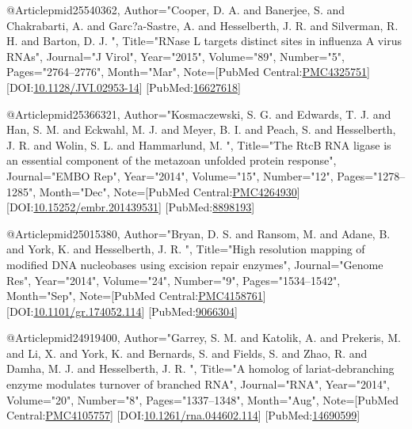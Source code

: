 @Article{pmid25540362,
   Author="Cooper, D. A.  and Banerjee, S.  and Chakrabarti, A.  and Garc?a-Sastre, A.  and Hesselberth, J. R.  and Silverman, R. H.  and Barton, D. J. ",
   Title="{{R}{N}ase {L} targets distinct sites in influenza {A} virus {R}{N}{A}s}",
   Journal="J Virol",
   Year="2015",
   Volume="89",
   Number="5",
   Pages="2764--2776",
   Month="Mar",
   Note={[PubMed Central:\href{https://www.ncbi.nlm.nih.gov/pmc/articles/PMC4325751}{PMC4325751}] [DOI:\href{https://dx.doi.org/10.1128/JVI.02953-14}{10.1128/JVI.02953-14}] [PubMed:\href{https://www.ncbi.nlm.nih.gov/pubmed/16627618}{16627618}] }
}

@Article{pmid25366321,
   Author="Kosmaczewski, S. G.  and Edwards, T. J.  and Han, S. M.  and Eckwahl, M. J.  and Meyer, B. I.  and Peach, S.  and Hesselberth, J. R.  and Wolin, S. L.  and Hammarlund, M. ",
   Title="{{T}he {R}tc{B} {R}{N}{A} ligase is an essential component of the metazoan unfolded protein response}",
   Journal="EMBO Rep",
   Year="2014",
   Volume="15",
   Number="12",
   Pages="1278--1285",
   Month="Dec",
   Note={[PubMed Central:\href{https://www.ncbi.nlm.nih.gov/pmc/articles/PMC4264930}{PMC4264930}] [DOI:\href{https://dx.doi.org/10.15252/embr.201439531}{10.15252/embr.201439531}] [PubMed:\href{https://www.ncbi.nlm.nih.gov/pubmed/8898193}{8898193}] }
}

@Article{pmid25015380,
   Author="Bryan, D. S.  and Ransom, M.  and Adane, B.  and York, K.  and Hesselberth, J. R. ",
   Title="{{H}igh resolution mapping of modified {D}{N}{A} nucleobases using excision repair enzymes}",
   Journal="Genome Res",
   Year="2014",
   Volume="24",
   Number="9",
   Pages="1534--1542",
   Month="Sep",
   Note={[PubMed Central:\href{https://www.ncbi.nlm.nih.gov/pmc/articles/PMC4158761}{PMC4158761}] [DOI:\href{https://dx.doi.org/10.1101/gr.174052.114}{10.1101/gr.174052.114}] [PubMed:\href{https://www.ncbi.nlm.nih.gov/pubmed/9066304}{9066304}] }
}

@Article{pmid24919400,
   Author="Garrey, S. M.  and Katolik, A.  and Prekeris, M.  and Li, X.  and York, K.  and Bernards, S.  and Fields, S.  and Zhao, R.  and Damha, M. J.  and Hesselberth, J. R. ",
   Title="{{A} homolog of lariat-debranching enzyme modulates turnover of branched {R}{N}{A}}",
   Journal="RNA",
   Year="2014",
   Volume="20",
   Number="8",
   Pages="1337--1348",
   Month="Aug",
   Note={[PubMed Central:\href{https://www.ncbi.nlm.nih.gov/pmc/articles/PMC4105757}{PMC4105757}] [DOI:\href{https://dx.doi.org/10.1261/rna.044602.114}{10.1261/rna.044602.114}] [PubMed:\href{https://www.ncbi.nlm.nih.gov/pubmed/14690599}{14690599}] }
}

